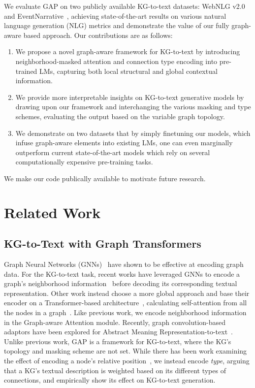 \documentclass[11pt]{article}
\begin{document}
We evaluate GAP on two publicly available KG-to-text datasets: WebNLG v2.0~\cite{shimorina2018handling} and EventNarrative~\cite{colas2021eventnarrative}, achieving state-of-the-art results on various natural language generation (NLG) metrics and demonstrate the value of our fully graph-aware based approach. Our contributions are as follows:
\begin{enumerate}
  \item We propose a novel graph-aware framework for KG-to-text by introducing neighborhood-masked attention and connection type encoding into pre-trained LMs, capturing both local structural and global contextual information.

  \item We provide more interpretable insights on KG-to-text generative models by drawing upon our framework and interchanging the various masking and type schemes, evaluating the output based on the variable graph topology.
  \item We demonstrate on two datasets that by simply finetuning our models, which infuse graph-aware elements into existing LMs, one can even marginally outperform current state-of-the-art models which rely on several computationally expensive pre-training tasks.
\end{enumerate}
We make our code publically available to motivate future research.

\section{Related Work}
\subsection{KG-to-Text with Graph Transformers}
Graph Neural Networks (GNNs)~\cite{velivckovic2018graph} have shown to be effective at encoding graph data. For the KG-to-text task, recent works have leveraged GNNs to encode a graph's neighborhood information~\cite{koncel2019text, marcheggiani2018deep,ribeiro2020modeling,schmitt2021modeling,guo2019densely,jin2020genwiki} before decoding its corresponding textual representation. Other work instead choose a more global approach and base their encoder on a Transformer-based architecture~\cite{vaswani2017attention}, calculating self-attention from all the nodes in a graph~\cite{zhu2019modeling,cai2020graph,ke-etal-2021-jointgt}. Like previous work, we encode neighborhood information in the Graph-aware Attention module. Recently, graph convolution-based adaptors have been explored for Abstract Meaning Representation-to-text~\cite{ribeiro-etal-2021-structural}. Unlike previous work, GAP is a framework for KG-to-text, where the KG's topology and masking scheme are not set. 
While there has been work examining the effect of encoding a node's relative position~\cite{shaw2018self,schmitt2021modeling}, we instead encode \textit{type}, arguing that a KG's textual description is weighted based on its different types of connections, and empirically show its effect on KG-to-text generation.
\end{document}
